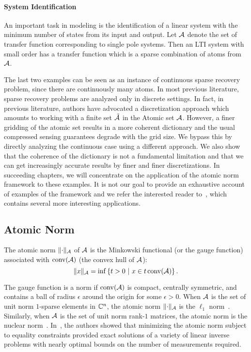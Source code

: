 \paragraph{System Identification} An important task in modeling is the
identification of a linear system with the minimum number of states from
its input and output. Let $\mathcal{A}$ denote the set of transfer function
corresponding to single pole systems. Then an LTI system with small order has
a transfer function which is a sparse combination of atoms from $\mathcal{A}$.

The last two examples can be seen as an instance of continuous sparse recovery
problem, since there are continuously many atoms. In most previous literature,
sparse recovery problems are analyzed only in discrete settings. In fact, in
previous literature, authors have advocated a discretization approach which
amounts to working with a finite set $\tilde{\mathcal{A}}$ in the Atomic set $\mathcal{A}$.
However, a finer gridding of the atomic set results in a more coherent
dictionary and the usual compressed sensing guarantees degrade with the grid
size. We bypass this by directly analyzing the continuous case using a different
approach. We also show that the coherence of the dictionary is not a fundamental
limitation and that we can get increasingly accurate results by finer and finer
discretizations. In succeeding chapters, we will concentrate on the application
of the atomic norm framework to these examples. It is not our goal to provide an
exhaustive account of examples of the framework and we refer the interested
reader to~\cite{crpw}, which contains several more interesting applications.

\subsection{Atomic Norm}

\begin{definition}
The atomic norm $\lVert\cdot\rVert_{\mathcal{A}}$ of $\mathcal{A}$ is the Minkowski functional (or the
gauge function) associated with $\operatorname{conv}(\mathcal{A})$ (the convex hull of $\mathcal{A}$):
\begin{equation}
	\label{defatnorm} \lVert x\rVert_{\mathcal{A}} = \inf\left\{t > 0 ~\middle|~ x \in t \operatorname{conv}(\mathcal{A}) \right\}. 
\end{equation}
\end{definition}

 The gauge function is a norm if $\operatorname{conv}(\mathcal{A})$ is compact, centrally
symmetric, and contains a ball of radius $\epsilon$ around the origin for some
$\epsilon>0$. When $\mathcal{A}$ is the set of unit norm $1$-sparse elements in $\mathbb{C}^n$,
the atomic norm $\lVert\cdot\rVert_{\mathcal{A}}$ is the $\ell_1$ norm~\cite{candes06}.
Similarly, when $\mathcal{A}$ is the set of unit norm rank-$1$ matrices, the atomic norm
is the nuclear norm~\cite{Recht10}. In~\cite{crpw}, the authors showed that
minimizing the atomic norm subject to equality constraints provided exact
solutions of a variety of linear inverse problems with nearly optimal bounds on
the number of measurements required.

